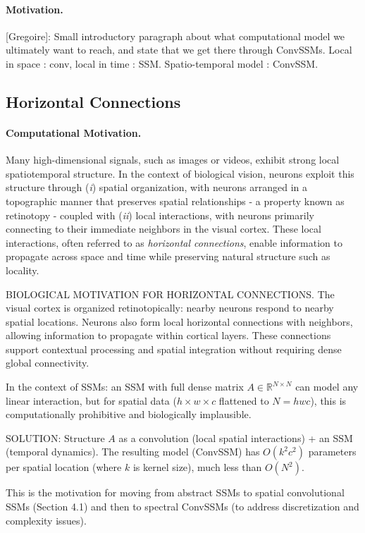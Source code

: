 \documentclass{article}
\newcommand{\greg}[1]{{\color{indigo}[Gregoire]: #1}}
\begin{document}
\paragraph{Motivation.} \greg{Small introductory paragraph about what computational model we ultimately want to reach, and state that we get there through ConvSSMs. Local in space : conv, local in time : SSM. Spatio-temporal model : ConvSSM.}

\subsection{Horizontal Connections}
\label{sec:horizontal_connections}

\paragraph{Computational Motivation.} Many high-dimensional signals, such as images or videos, exhibit strong local spatiotemporal structure. In the context of biological vision, neurons exploit this structure through (\emph{i}) spatial organization, with neurons arranged in a topographic manner that preserves spatial relationships - a property known as retinotopy \citep{TODO} - coupled with (\emph{ii}) local interactions, with neurons primarily connecting to their immediate neighbors in the visual cortex. These local interactions, often referred to as \emph{horizontal connections}, enable information to propagate across space and time while preserving natural structure such as locality.

\begin{thomasbox}
BIOLOGICAL MOTIVATION FOR HORIZONTAL CONNECTIONS. The visual cortex is organized retinotopically: nearby neurons respond to nearby spatial locations. Neurons also form local horizontal connections with neighbors, allowing information to propagate within cortical layers. These connections support contextual processing and spatial integration without requiring dense global connectivity.

In the context of SSMs: an SSM with full dense matrix $A \in \mathbb{R}^{N \times N}$ can model any linear interaction, but for spatial data ($h \times w \times c$ flattened to $N = hwc$), this is computationally prohibitive and biologically implausible.

SOLUTION: Structure $A$ as a convolution (local spatial interactions) + an SSM (temporal dynamics). The resulting model (ConvSSM) has $O(k^2 c^2)$ parameters per spatial location (where $k$ is kernel size), much less than $O(N^2)$.

This is the motivation for moving from abstract SSMs to spatial convolutional SSMs (Section 4.1) and then to spectral ConvSSMs (to address discretization and complexity issues).
\end{thomasbox}
\end{document}
